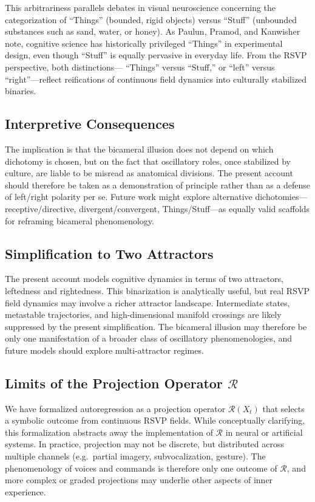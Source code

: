 \documentclass[a4paper,11pt]{article}
\begin{document}
This arbitrariness parallels debates in visual neuroscience concerning the
categorization of ``Things'' (bounded, rigid objects) versus ``Stuff''
(unbounded substances such as sand, water, or honey). As Paulun, Pramod, and
Kanwisher \citep{paulun2023thingsstuff} note, cognitive science has historically
privileged ``Things'' in experimental design, even though ``Stuff'' is equally
pervasive in everyday life. From the RSVP perspective, both distinctions—
``Things'' versus ``Stuff,'' or ``left'' versus ``right''—reflect reifications
of continuous field dynamics into culturally stabilized binaries.

\subsection{Interpretive Consequences}
The implication is that the bicameral illusion does not depend on which
dichotomy is chosen, but on the fact that oscillatory roles, once stabilized by
culture, are liable to be misread as anatomical divisions. The present account
should therefore be taken as a demonstration of principle rather than as a
defense of left/right polarity per se. Future work might explore alternative
dichotomies—receptive/directive, divergent/convergent, Things/Stuff—as equally
valid scaffolds for reframing bicameral phenomenology.

\subsection{Simplification to Two Attractors}
The present account models cognitive dynamics in terms of two attractors,
leftedness and rightedness. This binarization is analytically useful, but real
RSVP field dynamics may involve a richer attractor landscape. Intermediate
states, metastable trajectories, and high-dimensional manifold crossings are
likely suppressed by the present simplification. The bicameral illusion may
therefore be only one manifestation of a broader class of oscillatory
phenomenologies, and future models should explore multi-attractor regimes.

\subsection{Limits of the Projection Operator $\mathcal{R}$}
We have formalized autoregression as a projection operator
$\mathcal{R}(X_t)$ that selects a symbolic outcome from continuous RSVP fields.
While conceptually clarifying, this formalization abstracts away the
implementation of $\mathcal{R}$ in neural or artificial systems. In practice,
projection may not be discrete, but distributed across multiple channels (e.g.\
partial imagery, subvocalization, gesture). The phenomenology of voices and
commands is therefore only one outcome of $\mathcal{R}$, and more complex or
graded projections may underlie other aspects of inner experience.
\end{document}
